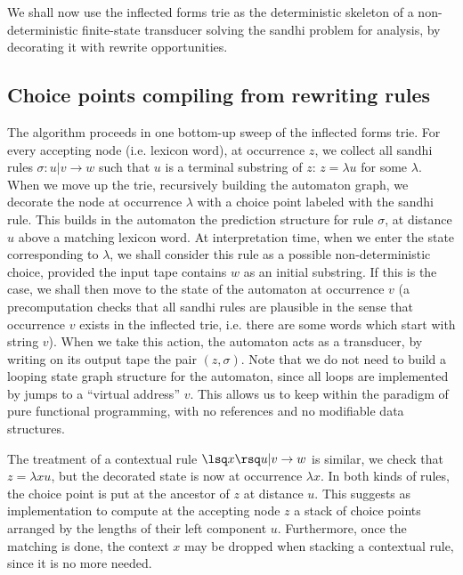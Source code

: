 We shall now use the inflected forms trie as the deterministic skeleton of a
non-deterministic finite-state transducer solving the sandhi problem for
analysis, by decorating it with rewrite opportunities. 

\subsection{Choice points compiling from rewriting rules}

The algorithm proceeds in one bottom-up sweep of the inflected forms trie. 
For every accepting node (i.e. lexicon word), at occurrence $z$, we collect
all sandhi rules 
$\sigma:u|v\rightarrow w$ such that $u$ is a terminal substring of
$z$: $z=\lambda u$ for some $\lambda$. When we move up the trie,
recursively building the automaton graph, we decorate the node
at occurrence $\lambda$ with a choice point labeled with the sandhi rule.
This builds in the automaton the prediction structure for rule $\sigma$,
at distance $u$ above a matching lexicon word. 
At interpretation time, when we enter the state corresponding to
$\lambda$, we shall consider this rule as a possible non-deterministic choice, 
provided the input tape contains $w$ as an initial substring. If this
is the case, we shall then move to the state of the automaton at occurrence
$v$ (a precomputation checks that all sandhi rules are plausible in the sense
that occurrence $v$ exists in the inflected trie, i.e. there are some words
which start with string $v$). When we take this action, the automaton acts 
as a transducer, by writing on its output tape the pair $(z,\sigma)$.
Note that we do not need to build a looping state graph structure 
for the automaton,
since all loops are implemented by jumps to a ``virtual address'' $v$.
This allows us to keep within the paradigm of pure functional programming,
with no references and no modifiable data structures.

The treatment of a contextual rule $\lsq x\rsq u|v\rightarrow w$
is similar, we check that $z=\lambda x u$, but the decorated state is
now at occurrence $\lambda x$. In both kinds of rules, the choice point 
is put at the ancestor of $z$ at distance $u$. This suggests as 
implementation to compute at the accepting node $z$ a stack of choice
points arranged by the lengths of their left component $u$. Furthermore,
once the matching is done, the context $x$ may be dropped when stacking a
contextual rule, since it is no more needed. 

